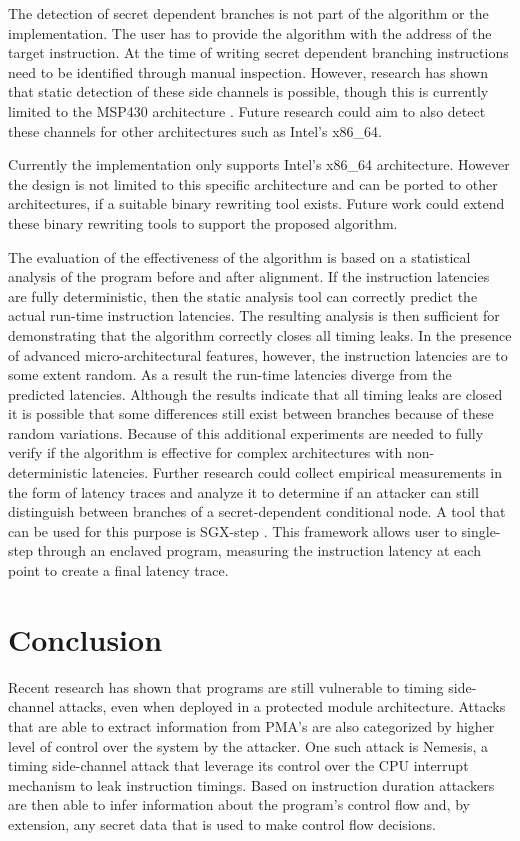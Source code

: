 The detection of secret dependent branches is not part of the algorithm or the implementation. 
The user has to provide the algorithm with the address of the target instruction. 
At the time of writing secret dependent branching instructions need to be identified through manual inspection. 
However, research has shown that static detection of these side channels is possible, though 
this is currently limited to the MSP430 architecture \cite{MSP430Detection}. Future research could aim to also detect these channels for other architectures such as Intel's x86\_64.

Currently the implementation only supports Intel's x86\_64 architecture. 
However the design is not limited to this specific architecture and can be ported to other architectures, if a suitable binary rewriting tool exists. 
Future work could extend these binary rewriting tools to support the proposed algorithm. 

The evaluation of the effectiveness of the algorithm is based on a statistical analysis of the program before and after alignment. 
If the instruction latencies are fully deterministic, then the static analysis tool can correctly predict the actual run-time instruction latencies. The resulting analysis 
is then sufficient for demonstrating that the algorithm correctly closes all timing leaks. 
In the presence of advanced micro-architectural features, however,  the instruction latencies are to some extent random. 
As a result the run-time latencies diverge from the predicted latencies. 
Although the results indicate that all timing leaks are closed it is possible that some differences still exist between branches because of these random variations. 
Because of this additional experiments are needed to fully verify if the algorithm is effective for complex architectures with non-deterministic latencies.
Further research could collect empirical measurements in the form of latency traces and analyze it to determine if an attacker can still distinguish between branches of a secret-dependent conditional node. 
A tool that can be used for this purpose is SGX-step \cite{sgx-step}. 
This framework allows user to single-step through an enclaved program, measuring the instruction latency at each point to create a final latency trace. 

\section{Conclusion}
Recent research has shown that programs are still vulnerable to timing side-channel attacks, even when deployed in a protected module architecture. 
Attacks that are able to extract information from PMA's are also categorized by higher level of control over the system by the attacker. 
One such attack is Nemesis, a timing side-channel attack that leverage its control over the CPU interrupt mechanism to leak instruction timings. 
Based on instruction duration attackers are then able to infer information about the program's control flow and, by extension, any secret data that is used to make control flow decisions. 

